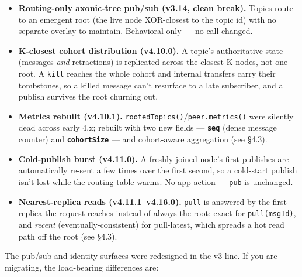 \documentclass[
  nobib]{tufte-handout}
\providecommand{\tightlist}{%
  \setlength{\itemsep}{0pt}\setlength{\parskip}{0pt}}
\renewcommand{\subsubsection}[1]{\medskip\par\noindent{\normalsize\bfseries #1}\par\nobreak\smallskip}
\begin{document}
\begin{itemize}
\tightlist
\item
  \textbf{Routing-only axonic-tree pub/sub (v3.14, clean break).} Topics
  route to an emergent root (the live node XOR-closest to the topic id)
  with no separate overlay to maintain. Behavioral only --- no call
  changed.
\item
  \textbf{K-closest cohort distribution (v4.10.0).} A topic's
  authoritative state (messages \emph{and} retractions) is replicated
  across the closest-K nodes, not one root. A \texttt{kill} reaches the
  whole cohort and internal transfers carry their tombstones, so a
  killed message can't resurface to a late subscriber, and a publish
  survives the root churning out.
\item
  \textbf{Metrics rebuilt (v4.10.1).}
  \texttt{rootedTopics()}/\texttt{peer.metrics()} were silently dead
  across early 4.x; rebuilt with two new fields ---
  \textbf{\texttt{seq}} (dense message counter) and
  \textbf{\texttt{cohortSize}} --- and cohort-aware aggregation (see
  §4.3).
\item
  \textbf{Cold-publish burst (v4.11.0).} A freshly-joined node's first
  publishes are automatically re-sent a few times over the first second,
  so a cold-start publish isn't lost while the routing table warms. No
  app action --- \texttt{pub} is unchanged.
\item
  \textbf{Nearest-replica reads (v4.11.1--v4.16.0).} \texttt{pull} is
  answered by the first replica the request reaches instead of always
  the root: exact for \texttt{pull(msgId)}, and \emph{recent}
  (eventually-consistent) for pull-latest, which spreads a hot read path
  off the root (see §4.3).
\end{itemize}

\subsubsection{What changed since v2.x}\label{what-changed-since-v2.x}

The pub/sub and identity surfaces were redesigned in the v3 line. If you
are migrating, the load-bearing differences are:
\end{document}
